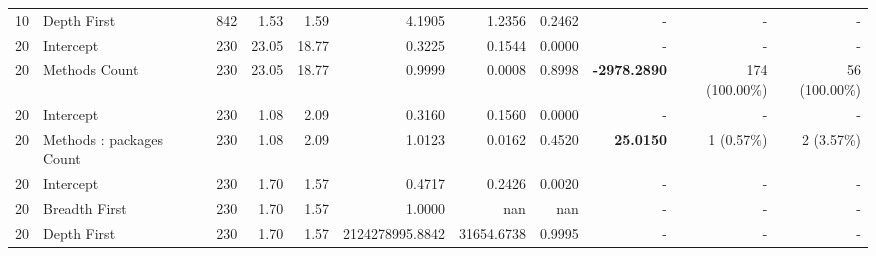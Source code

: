 \begin{landscape}
\begin{table}[H]
\begin{tabular}{r l r r r r r r r r r}
10 & Depth First & 842 & 1.53 & 1.59 & 4.1905 & 1.2356 & 0.2462 & - & - & - \\ 
20 & Intercept & 230 & 23.05 & 18.77 & 0.3225 & 0.1544 & 0.0000 & - & - & - \\ 
20 & Methods Count & 230 & 23.05 & 18.77 & 0.9999 & 0.0008 & 0.8998 & \textbf{-2978.2890} & 174 (100.00\%) & 56 (100.00\%) \\ 
20 & Intercept & 230 & 1.08 & 2.09 & 0.3160 & 0.1560 & 0.0000 & - & - & - \\ 
20 & Methods : packages Count & 230 & 1.08 & 2.09 & 1.0123 & 0.0162 & 0.4520 & \textbf{25.0150} & 1 (0.57\%) & 2 (3.57\%) \\ 
20 & Intercept & 230 & 1.70 & 1.57 & 0.4717 & 0.2426 & 0.0020 & - & - & - \\ 
20 & Breadth First & 230 & 1.70 & 1.57 & 1.0000 & nan & nan & - & - & - \\ 
20 & Depth First & 230 & 1.70 & 1.57 & 2124278995.8842 & 31654.6738 & 0.9995 & - & - & - \\ 
\bottomrule
\end{tabular}%
\label{tab:codebase_graph_latex_repository_graph_component_time_series_strategy_logistic_regressionCore_False_methods_20} 
\end{table}
\end{landscape}
\newpage 

 \newpage 
